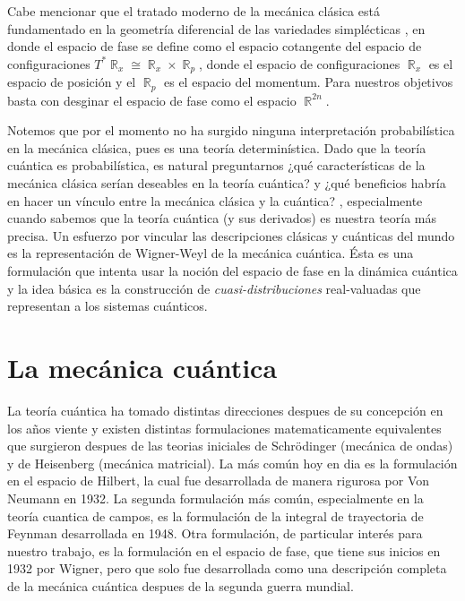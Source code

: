 \documentclass[a4paper]{report}
\DeclareMathOperator{\R}{\mathbb{R}}
\begin{document}
  Cabe mencionar que el tratado moderno de la mecánica
  clásica está fundamentado en la geometría diferencial de
  las variedades simplécticas
  \cite{mcinerneyFirstStepsDifferential2013}, en donde el
  espacio de fase se define como el espacio cotangente del
  espacio de configuraciones $T^{*} \R_x \cong \R_x \times
  \R_p$, donde el espacio de configuraciones  $\R_x$ es el
  espacio de posición y el $\R_p$ es el espacio del
  momentum.  Para nuestros objetivos basta con desginar el
  espacio de fase como el espacio $\R^{2n}$.

  Notemos que por el momento no ha surgido ninguna
  interpretación probabilística en la mecánica clásica, pues
  es una teoría determinística. Dado que la teoría cuántica
  es probabilística, es natural preguntarnos ¿qué
  características de la mecánica clásica serían deseables en
  la teoría cuántica? y ¿qué beneficios habría en hacer un
  vínculo entre la mecánica clásica y la cuántica?
  \cite{schroeckQuantumMechanicsPhase1996}, especialmente
  cuando sabemos que la teoría cuántica (y sus derivados) es
  nuestra teoría más precisa. Un esfuerzo por vincular las
  descripciones clásicas y cuánticas del mundo es la
  representación de Wigner-Weyl de la mecánica cuántica.
  Ésta es una formulación que intenta usar la noción del
  espacio de fase en la dinámica cuántica y la idea básica
  es la construcción de \textit{cuasi-distribuciones}
  real-valuadas que representan a los sistemas cuánticos.

  \section{La mecánica cuántica}

  La teoría cuántica ha tomado distintas direcciones despues
  de su concepción en los años viente y existen distintas
  formulaciones matematicamente equivalentes que surgieron
  despues de las teorias iniciales de Schrödinger (mecánica
  de ondas) y de Heisenberg (mecánica matricial).  La más
  común hoy en dia es la formulación en el espacio de
  Hilbert, la cual fue desarrollada de manera rigurosa por
  Von Neumann en 1932.  La segunda formulación más común,
  especialmente en la teoría cuantica de campos, es la
  formulación de la integral de trayectoria de Feynman
  desarrollada en 1948.  Otra formulación, de particular
  interés para nuestro trabajo, es la formulación en el
  espacio de fase, que tiene sus inicios en 1932 por Wigner,
  pero que solo fue desarrollada como una descripción
  completa de la mecánica cuántica despues de la segunda
  guerra mundial. 
\end{document}
